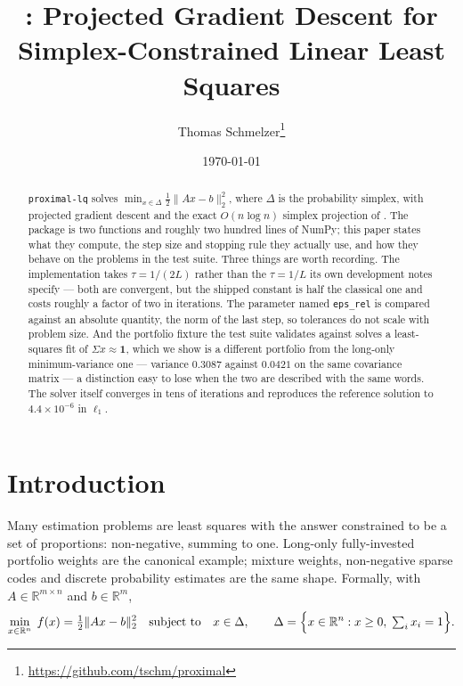 \documentclass[11pt,a4paper]{article}
\title{\code{proximal-lq}: Projected Gradient Descent for
Simplex-Constrained Linear Least Squares}
\author{Thomas Schmelzer\thanks{\url{https://github.com/tschm/proximal}}}
\date{\today}
\newcommand{\code}[1]{\texttt{#1}}
\newcommand{\simplex}{\Delta}
\newcommand{\R}{\mathbb{R}}
\begin{document}
\maketitle

\begin{abstract}
\code{proximal-lq} solves $\min_{x \in \simplex} \tfrac{1}{2}\|Ax-b\|_2^2$,
where $\simplex$ is the probability simplex, with projected gradient descent and
the exact $O(n \log n)$ simplex projection of \citet{duchi2008}. The package is
two functions and roughly two hundred lines of NumPy; this paper states what
they compute, the step size and stopping rule they actually use, and how they
behave on the problems in the test suite. Three things are worth recording. The
implementation takes $\tau = 1/(2L)$ rather than the $\tau = 1/L$ its own
development notes specify --- both are convergent, but the shipped constant is
half the classical one and costs roughly a factor of two in iterations. The
parameter named \code{eps\_rel} is compared against an absolute quantity, the
norm of the last step, so tolerances do not scale with problem size. And the
portfolio fixture the test suite validates against solves a least-squares fit of
$\Sigma x \approx \mathbf{1}$, which we show is a different portfolio from the
long-only minimum-variance one --- variance $0.3087$ against $0.0421$ on the
same covariance matrix --- a distinction easy to lose when the two are described
with the same words. The solver itself converges in tens of iterations and
reproduces the reference solution to $4.4 \times 10^{-6}$ in $\ell_1$.
\end{abstract}

\section{Introduction}

Many estimation problems are least squares with the answer constrained to be a
set of proportions: non-negative, summing to one. Long-only fully-invested
portfolio weights \citep{markowitz1952} are the canonical example; mixture
weights, non-negative sparse codes and discrete probability estimates are the
same shape. Formally, with $A \in \R^{m \times n}$ and $b \in \R^m$,
\begin{equation}
  \min_{x \in \R^n} \; f(x) = \tfrac{1}{2} \| A x - b \|_2^2
  \quad \text{subject to} \quad x \in \simplex,
  \qquad
  \simplex = \Bigl\{ x \in \R^n : x \ge 0, \; \textstyle\sum_i x_i = 1 \Bigr\}.
  \label{eq:problem}
\end{equation}
\end{document}
